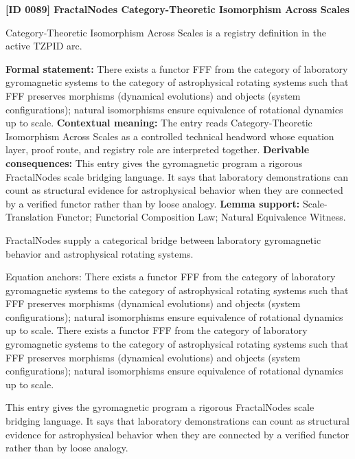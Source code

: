 \clearpage
\noindent\textbf{[ID 0089] FractalNodes Category-Theoretic Isomorphism Across Scales}\par
\vspace{0.35em}
\begingroup\small
{}
Category-Theoretic Isomorphism Across Scales is a registry definition in the active TZPID arc.

\begingroup\footnotesize\setlength{\emergencystretch}{3em}\sloppy
\textbf{Formal statement:} There exists a functor FFF from the category of laboratory gyromagnetic systems to the category of astrophysical rotating systems such that FFF preserves morphisms (dynamical evolutions) and objects (system configurations); natural isomorphisms ensure equivalence of rotational dynamics up to scale. \textbf{Contextual meaning:} The entry reads Category-Theoretic Isomorphism Across Scales as a controlled technical headword whose equation layer, proof route, and registry role are interpreted together. \textbf{Derivable consequences:} This entry gives the gyromagnetic program a rigorous FractalNodes scale bridging language. It says that laboratory demonstrations can count as structural evidence for astrophysical behavior when they are connected by a verified functor rather than by loose analogy. \textbf{Lemma support:} Scale-Translation Functor; Functorial Composition Law; Natural Equivalence Witness.\par
\endgroup

FractalNodes supply a categorical bridge between laboratory gyromagnetic behavior and astrophysical rotating systems.

Equation anchors: There exists a functor FFF from the category of laboratory gyromagnetic systems to the category of astrophysical rotating systems such that FFF preserves morphisms (dynamical evolutions) and objects (system configurations); natural isomorphisms ensure equivalence of rotational dynamics up to scale. There exists a functor FFF from the category of laboratory gyromagnetic systems to the category of astrophysical rotating systems such that FFF preserves morphisms (dynamical evolutions) and objects (system configurations); natural isomorphisms ensure equivalence of rotational dynamics up to scale.

This entry gives the gyromagnetic program a rigorous FractalNodes scale bridging language. It says that laboratory demonstrations can count as structural evidence for astrophysical behavior when they are connected by a verified functor rather than by loose analogy.
\endgroup

